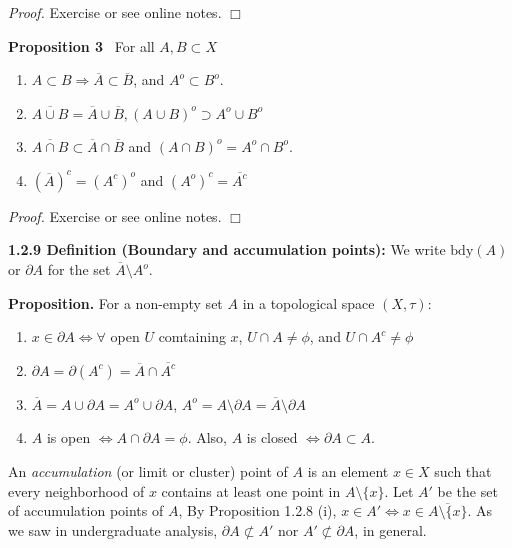 \documentclass[12pt]{article}
\newcommand{\rimply}[0] { \Rightarrow }
\newcommand{\lrimply}[0] { \Leftrightarrow }
\begin{document}
\begin{flushleft}
\begin{enumerate}
            \end{enumerate}\begin{flushleft} 
 \emph{Proof.  }Exercise or see online notes. $\Box$ \end{flushleft}\end{flushleft}\begin{flushleft} 
 { \bf Proposition  3 } \  For all $A, B \subset X$\begin{enumerate}
\item
                $A \subset B \rimply \overline{A} \subset \overline{B}$, and $A^o \subset B^o$.
            \item
                $\overline{A \cup B} = \overline{A} \cup \overline{B}, ( A \cup B )^o \supset A^o \cup  B^o$
            \item
                $\overline{A \cap B} \subset \overline{A} \cap \overline{B}$ and $ (A \cap B)^o = A^o \cap B^o$.
            \item
                $(\overline{A})^c = (A^c)^o$ and $(A^o)^c = \overline{A^c}$
            \end{enumerate}\begin{flushleft} 
 \emph{Proof.  }Exercise or see online notes. $\Box$ 
\end{flushleft}\end{flushleft}\begin{flushleft} 
 { \bf 1.2.9 Definition (Boundary and accumulation points):} We write
 $\textrm{bdy}(A)$ or $\partial A$ for the set
$\overline{A} \setminus A^o$.  
\end{flushleft}\begin{flushleft} 
 { \bf Proposition. }For a non-empty set $A$ in a topological space $(X, \tau)$:\begin{enumerate}[i]
\item
                $x \in \partial A \lrimply \forall $ open $U$ comtaining $x$, $U \cap A \not = \phi$, and $U \cap A^c \not = \phi$
            \item
                $\partial A = \partial (A ^c) = \overline{A} \cap \overline{A^c}$
            \item
                $\overline{A} = A \cup \partial A = A^o \cup \partial A$, $A^o = A \setminus \partial A = \overline{A} \setminus \partial A$
            \item
                $A$ is open $\lrimply A \cap \partial A = \phi$.  
Also, $A$ is closed $\lrimply \partial A \subset A$.
            \end{enumerate}
An {\em accumulation} (or limit or cluster) point of $A$ is an
element $x \in X$ such that every neighborhood of $x$ contains at least one point in $A \setminus \{ x \}$.
Let $A'$ be the set of accumulation points of $A$, By Proposition 1.2.8 
(i), $x \in A' \lrimply x \in \overline{ A \setminus \{ x \}}$. As we saw in undergraduate analysis, $\partial A \not \subset A'$ nor $A' \not \subset \partial A$, in general.\end{flushleft}\begin{flushleft} 


\end{flushleft}
\end{document}
